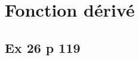 \documentclass[12pt,a5paper]{book}
\begin{document}


\newpage
\section*{Fonction dérivé}

\subsection*{Ex 26 p 119}
\end{document}
